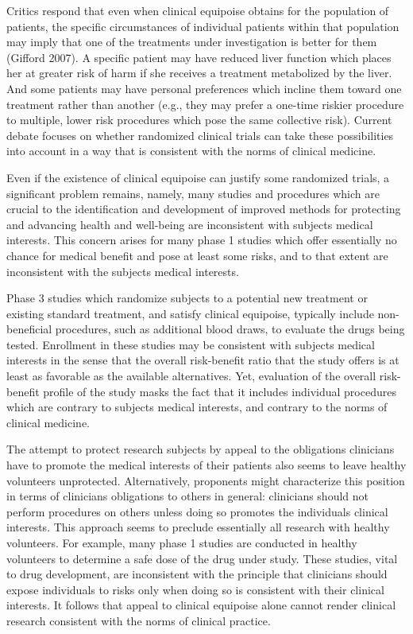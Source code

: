 \documentclass[12p]{article}
\begin{document}
Critics respond that even when clinical equipoise obtains for the population of patients, the specific circumstances of individual patients within that population may imply that one of the treatments under investigation is better for them (Gifford 2007). A specific patient may have reduced liver function which places her at greater risk of harm if she receives a treatment metabolized by the liver. And some patients may have personal preferences which incline them toward one treatment rather than another (e.g., they may prefer a one-time riskier procedure to multiple, lower risk procedures which pose the same collective risk). Current debate focuses on whether randomized clinical trials can take these possibilities into account in a way that is consistent with the norms of clinical medicine.

Even if the existence of clinical equipoise can justify some randomized trials, a significant problem remains, namely, many studies and procedures which are crucial to the identification and development of improved methods for protecting and advancing health and well-being are inconsistent with subjects medical interests. This concern arises for many phase 1 studies which offer essentially no chance for medical benefit and pose at least some risks, and to that extent are inconsistent with the subjects medical interests.

Phase 3 studies which randomize subjects to a potential new treatment or existing standard treatment, and satisfy clinical equipoise, typically include non-beneficial procedures, such as additional blood draws, to evaluate the drugs being tested. Enrollment in these studies may be consistent with subjects medical interests in the sense that the overall risk-benefit ratio that the study offers is at least as favorable as the available alternatives. Yet, evaluation of the overall risk-benefit profile of the study masks the fact that it includes individual procedures which are contrary to subjects medical interests, and contrary to the norms of clinical medicine.

The attempt to protect research subjects by appeal to the obligations clinicians have to promote the medical interests of their patients also seems to leave healthy volunteers unprotected. Alternatively, proponents might characterize this position in terms of clinicians obligations to others in general: clinicians should not perform procedures on others unless doing so promotes the individuals clinical interests. This approach seems to preclude essentially all research with healthy volunteers. For example, many phase 1 studies are conducted in healthy volunteers to determine a safe dose of the drug under study. These studies, vital to drug development, are inconsistent with the principle that clinicians should expose individuals to risks only when doing so is consistent with their clinical interests. It follows that appeal to clinical equipoise alone cannot render clinical research consistent with the norms of clinical practice.
\end{document}
